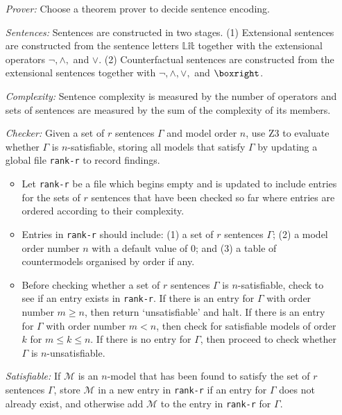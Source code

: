 \documentclass[a4paper, 11pt]{article} %
\newcommand{\Lit}[0]{\mathbb{Lit}}
\newcommand{\M}[0]{\mathcal{M}}
\begin{document}
\begin{enumerate}
  \item[\it Prover:] Choose a theorem prover to decide sentence encoding. 
  \item[\it Sentences:] Sentences are constructed in two stages.
    (1) Extensional sentences are constructed from the sentence letters $\Lit$ together with the extensional operators $\neg,\wedge,$ and $\vee$.
    (2) Counterfactual sentences are constructed from the extensional sentences together with $\neg,\wedge,\vee,$ and $\boxright$.
  \item[\it Complexity:] Sentence complexity is measured by the number of operators and sets of sentences are measured by the sum of the complexity of its members.
  \item[\it Checker:] Given a set of $r$ sentences $\Gamma$ and model order $n$, use Z3 to evaluate whether $\Gamma$ is $n$-satisfiable, storing all models that satisfy $\Gamma$ by updating a global file \texttt{rank-r} to record findings.
    \begin{itemize}
      \item Let \texttt{rank-r} be a file which begins empty and is updated to include entries for the sets of $r$ sentences that have been checked so far where entries are ordered according to their complexity.
      \item Entries in \texttt{rank-r} should include: (1) a set of $r$ sentences $\Gamma$; (2) a model order number $n$ with a default value of 0; and (3) a table of countermodels organised by order if any.
      \item Before checking whether a set of $r$ sentences $\Gamma$ is $n$-satisfiable, check to see if an entry exists in \texttt{rank-r}. If there is an entry for $\Gamma$ with order number $m\geq n$, then return `unsatisfiable' and halt. If there is an entry for $\Gamma$ with order number $m<n$, then check for satisfiable models of order $k$ for $m\leq k\leq n$. If there is no entry for $\Gamma$, then proceed to check whether $\Gamma$ is $n$-unsatisfiable. 
    \end{itemize}
  \item[\it Satisfiable:] If $\M$ is an $n$-model that has been found to satisfy the set of $r$ sentences $\Gamma$, store $\M$ in a new entry in \texttt{rank-r} if an entry for $\Gamma$ does not already exist, and otherwise add $\M$ to the entry in \texttt{rank-r} for $\Gamma$.

\end{enumerate}
\end{document}
